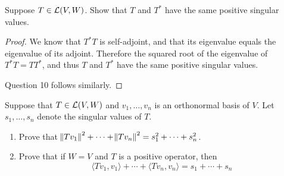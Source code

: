 \documentclass{extarticle}
\begin{document}




\begin{problem}{9}
    Suppose \(T \in \mathcal{L}(V, W)\). Show that \(T\) and \(T^*\) have the same positive singular 
    values.
\end{problem}

\begin{proof}
We know that \(T^*T\) is self-adjoint, and that its eigenvalue equals the eigenvalue of its adjoint. 
Therefore the squared root of the eigenvalue of \(T^*T = TT^*\), and thus \(T\) and \(T^*\) have 
the same positive singular values.

Question 10 follows similarly. 
\end{proof}


\begin{problem}{11}
    Suppose that \(T \in \mathcal{L}(V, W)\) and \(v_1, \ldots, v_n\) is an orthonormal basis of \(V\). 
    Let \(s_1, \ldots, s_n\) denote the singular values of \(T\). 
    \begin{enumerate}[label=(\alph*)]
        \item Prove that \(\norm{Tv_1}^2 + \cdots + \norm{Tv_n}^2 = s_1^2 + \cdots + s_n^2\). 
        \item Prove that if \(W = V\) and \(T\) is a positive operator, then 
        \[\langle Tv_1,v_1 \rangle + \cdots + \langle Tv_n,v_n \rangle = s_1 + \cdots + s_n\]
    \end{enumerate}
\end{problem}
\end{document}
